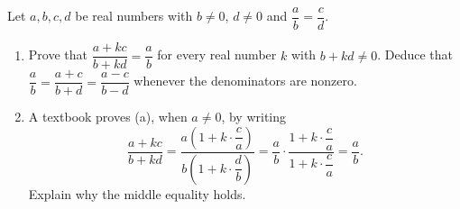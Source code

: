 Let $a,b,c,d$ be real numbers with $b\ne0$, $d\ne0$ and $\dfrac {a}{b}=\dfrac {c}{d}$.
\begin{enumerate}
\item[(a)] Prove that $\dfrac{a+kc}{b+kd}=\dfrac {a}{b}$ for every real number $k$ with $b+kd\ne0$. Deduce that $\dfrac {a}{b}=\dfrac{a+c}{b+d}=\dfrac{a-c}{b-d}$ whenever the denominators are nonzero.
\item[(b)] A textbook proves (a), when $a\ne0$, by writing
\[
\dfrac{a+kc}{b+kd}=\dfrac{a\left(1+k\cdot\dfrac {c}{a}\right)}{b\left(1+k\cdot\dfrac {d}{b}\right)}=\dfrac {a}{b}\cdot\dfrac{1+k\cdot\dfrac {c}{a}}{1+k\cdot\dfrac {c}{a}}=\dfrac {a}{b} .
\]
Explain why the middle equality holds.
\end{enumerate}
